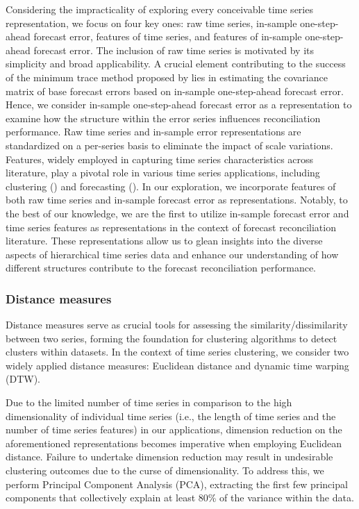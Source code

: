 \documentclass[a4paper,review,12pt,authoryear]{elsarticle}
\begin{document}
Considering the impracticality of exploring every conceivable time series representation, we focus on four key ones: raw time series, in-sample one-step-ahead forecast error, features of time series, and features of in-sample one-step-ahead forecast error.
The inclusion of raw time series is motivated by its simplicity and broad applicability.
A crucial element contributing to the success of the minimum trace method proposed by \cite{wickramasuriyaOptimalForecastReconciliation2019} lies in estimating the covariance matrix of base forecast errors based on in-sample one-step-ahead forecast error. Hence, we consider in-sample one-step-ahead forecast error as a representation to examine how the structure within the error series influences reconciliation performance. 
Raw time series and in-sample error representations are standardized on a per-series basis to eliminate the impact of scale variations.
Features, widely employed in capturing time series characteristics across literature, play a pivotal role in various time series applications, including clustering (\citealp{tianoFeatTSFeaturebasedTime2021}) and forecasting (\citealp{wangUncertaintyEstimationFeaturebased2022, liFeaturebasedIntermittentDemand2023}). In our exploration, we incorporate features of both raw time series and in-sample forecast error as representations. 
Notably, to the best of our knowledge, we are the first to utilize in-sample forecast error and time series features as representations in the context of forecast reconciliation literature.
These representations allow us to glean insights into the diverse aspects of hierarchical time series data and enhance our understanding of how different structures contribute to the forecast reconciliation performance.




\subsubsection*{Distance measures}

Distance measures serve as crucial tools for assessing the similarity/dissimilarity between two series, forming the foundation for clustering algorithms to detect clusters within datasets. In the context of time series clustering, we consider two widely applied distance measures: Euclidean distance and dynamic time warping (DTW). 

Due to the limited number of time series in comparison to the high dimensionality of individual time series (i.e., the length of time series and the number of time series features) in our applications, dimension reduction on the aforementioned representations becomes imperative when employing Euclidean distance. Failure to undertake dimension reduction may result in undesirable clustering outcomes due to the curse of dimensionality. To address this, we perform Principal Component Analysis (PCA), extracting the first few principal components that collectively explain at least 80\% of the variance within the data.
\end{document}

